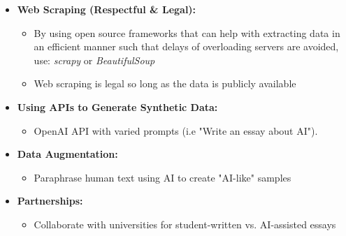 \documentclass{article} %
\begin{document}
\begin{itemize}
    \item \textbf{Web Scraping (Respectful \& Legal):}
    \begin{itemize}
        \item By using open source frameworks that can help with extracting data in an efficient manner such that delays of overloading servers are avoided, use: \textit{scrapy} or \textit{BeautifulSoup}
        \item Web scraping is legal so long as the data is publicly available
    \end{itemize}
    
    \item \textbf{Using APIs to Generate Synthetic Data:}
    \begin{itemize}
        \item OpenAI API with varied prompts (i.e "Write an essay about AI").
    \end{itemize}
    
    \item \textbf{Data Augmentation:}
    \begin{itemize}
        \item Paraphrase human text using AI to create "AI-like" samples
    \end{itemize}
    
    \item \textbf{Partnerships:}
    \begin{itemize}
        \item Collaborate with universities for student-written vs. AI-assisted essays
    \end{itemize}
\end{itemize}
\end{document}
